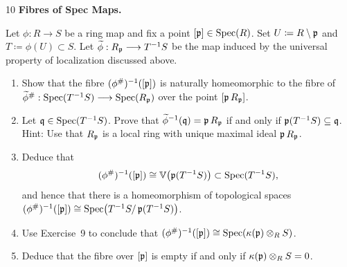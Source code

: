 \documentclass[Notebook.tex]{subfiles}
\begin{document}
\begin{problem}{10}
    \textbf{Fibres of Spec Maps.} 
    
    Let $\phi:R\to S$ be a ring map and fix a point $[\operatorname{\mathfrak{p}}]\in \operatorname{Spec}(R)$. Set $U \coloneqq R \setminus \operatorname{\mathfrak{p}}$ and $T\coloneqq \phi(U) \subset S$. Let $\widetilde{\phi}:R_{\operatorname{\mathfrak{p}}}\longrightarrow T^{-1}S$ be the map induced by the universal property of localization discussed above. 
    \begin{enumerate}
        \item Show that the fibre $(\phi^{\#})^{-1}([\operatorname{\mathfrak{p}}])$ is naturally homeomorphic to the fibre of $\widetilde{\phi}^{\#}:\operatorname{Spec}(T^{-1}S)\longrightarrow \operatorname{Spec}(R_{\operatorname{\mathfrak{p}}})$ over the point $[\operatorname{\mathfrak{p}} R_{\operatorname{\mathfrak{p}}}]$.
        \item Let $\operatorname{\mathfrak{q}}\in \operatorname{Spec}(T^{-1}S)$. Prove that $\widetilde{\phi}^{-1}(\operatorname{\mathfrak{q}})=\operatorname{\mathfrak{p}} R_{\operatorname{\mathfrak{p}}}$ if and only if $\operatorname{\mathfrak{p}}(T^{-1}S)\subseteq \operatorname{\mathfrak{q}}$. Hint: Use that $R_{\operatorname{\mathfrak{p}}}$ is a local ring with unique maximal ideal $\operatorname{\mathfrak{p}} R_{\operatorname{\mathfrak{p}}}$.
        \item Deduce that
        \[
        (\phi^{\#})^{-1}([\operatorname{\mathfrak{p}}])\cong \mathbb V\!\left(\operatorname{\mathfrak{p}}(T^{-1}S)\right)\subset \operatorname{Spec}(T^{-1}S),
        \]
        and hence that there is a homeomorphism of topological spaces $(\phi^{\#})^{-1}([\operatorname{\mathfrak{p}}]) \cong \operatorname{Spec}\!\left(T^{-1}S/\operatorname{\mathfrak{p}}(T^{-1}S)\right)$.
        \item Use Exercise~9 to conclude that $(\phi^{\#})^{-1}([\operatorname{\mathfrak{p}}]) \cong \operatorname{Spec}(\kappa(\operatorname{\mathfrak{p}})\otimes_R S)$.
        \item Deduce that the fibre over $[\operatorname{\mathfrak{p}}]$ is empty if and only if $\kappa(\operatorname{\mathfrak{p}})\otimes_R S=0$.
    \end{enumerate}
\end{problem}
\end{document}
